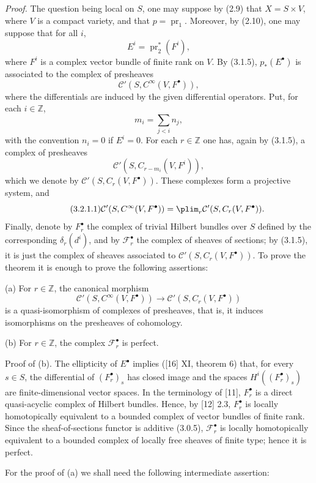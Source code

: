 \emph{Proof.} The question being local on $S$, one may suppose by (2.9) that $X=S\times V$, where $V$ is a compact variety, and that $p=\operatorname{pr}_1$. Moreover, by (2.10), one may suppose that for all $i$,
\[
 E^i=\operatorname{pr}_2^*(F^i),
\]
where $F^i$ is a complex vector bundle of finite rank on $V$. By (3.1.5), $p_*(E^\bullet)$ is associated to the complex of presheaves
\[
 \mathcal C'(S,C^\infty(V,F^\bullet)),
\]
where the differentials are induced by the given differential operators. Put, for each $i\in\mathbb Z$,
\[
 m_i=\sum_{j<i}n_j,
\]
with the convention $n_i=0$ if $E^i=0$. For each $r\in\mathbb Z$ one has, again by (3.1.5), a complex of presheaves
\[
 \mathcal C'(S,C_{r-m_i}(V,F^i)),
\]
which we denote by $\mathcal C'(S,C_r(V,F^\bullet))$. These complexes form a projective system, and
\begin{equation}\tag{3.2.1.1}
 \mathcal C'(S,C^\infty(V,F^\bullet))
 =\plim_r \mathcal C'(S,C_r(V,F^\bullet)).
\end{equation}
Finally, denote by $F_r^\bullet$ the complex of trivial Hilbert bundles over $S$ defined by the corresponding $\delta_r(d^i)$, and by $\mathcal F_r^\bullet$ the complex of sheaves of sections; by (3.1.5), it is just the complex of sheaves associated to $\mathcal C'(S,C_r(V,F^\bullet))$. To prove the theorem it is enough to prove the following assertions:

(a) For $r\in\mathbb Z$, the canonical morphism
\[
 \mathcal C'(S,C^\infty(V,F^\bullet))\longrightarrow \mathcal C'(S,C_r(V,F^\bullet))
\]
is a quasi-isomorphism of complexes of presheaves, that is, it induces isomorphisms on the presheaves of cohomology.

(b) For $r\in\mathbb Z$, the complex $\mathcal F_r^\bullet$ is perfect.

Proof of (b). The ellipticity of $E^\bullet$ implies ([16] XI, theorem 6) that, for every $s\in S$, the differential of $(F_r^\bullet)_s$ has closed image and the spaces $H^i((F_r^\bullet)_s)$ are finite-dimensional vector spaces. In the terminology of [11], $F_r^\bullet$ is a direct quasi-acyclic complex of Hilbert bundles. Hence, by [12] 2.3, $F_r^\bullet$ is locally homotopically equivalent to a bounded complex of vector bundles of finite rank. Since the sheaf-of-sections functor is additive (3.0.5), $\mathcal F_r^\bullet$ is locally homotopically equivalent to a bounded complex of locally free sheaves of finite type; hence it is perfect.

For the proof of (a) we shall need the following intermediate assertion:

